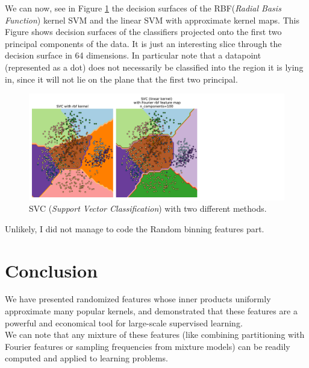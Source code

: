 \documentclass{article}
\begin{document}
We can now, see in Figure \ref{frontiere} the decision surfaces of the RBF(\textit{Radial Basis Function}) kernel SVM and the linear SVM with approximate kernel maps. This Figure shows decision surfaces of the classifiers projected onto the first two principal components of the data. It is just an interesting slice through the decision surface in 64 dimensions. In particular note that a datapoint (represented as a dot) does not necessarily be classified into the region it is lying in, since it will not lie on the plane that the first two principal.
\begin{figure}[h!]
    \centering
    \includegraphics[scale=0.5]{images/frontiere.pdf}
    \caption{SVC (\textit{Support Vector Classification}) with two different methods.}
    \label{frontiere}
\end{figure}

Unlikely, I did not manage to code the Random binning features part. 

\newpage
\section{Conclusion}
We have presented randomized features whose inner products uniformly approximate many popular kernels, and demonstrated that these features are a powerful and economical tool for large-scale supervised learning.\\

We can note that any mixture of these features (like combining partitioning with Fourier features or sampling frequencies from mixture models) can be readily computed and applied to learning problems. 


\newpage

\nocite{*}

\end{document}

